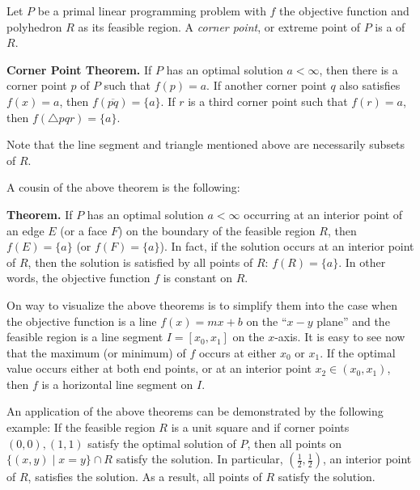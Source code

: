 \documentclass[12pt]{article}
\begin{document}
Let $P$ be a primal linear programming problem with $f$ the objective function and polyhedron $R$ as its feasible region.  A \emph{corner point}, or extreme point of $P$ is a  of $R$.

\textbf{Corner Point Theorem.}  If $P$ has an optimal solution $a<\infty$, then there is a corner point $p$ of $P$ such that $f(p)=a$.  If another corner point $q$ also satisfies $f(x)=a$, then $f(\overline{pq})=\lbrace a\rbrace$.  If $r$ is a third corner point such that $f(r)=a$, then $f(\triangle pqr)=\lbrace a\rbrace$.

Note that the line segment and triangle mentioned above are necessarily subsets of $R$.

A cousin of the above theorem is the following:

\textbf{Theorem.}  If $P$ has an optimal solution $a<\infty$ occurring at an interior point of an edge $E$ (or a face $F$) on the boundary of the feasible region $R$, then $f(E)=\lbrace a\rbrace$ (or $f(F)=\lbrace a\rbrace$).  In fact, if the solution occurs at an interior point of $R$, then the solution is satisfied by all points of $R$: $f(R)=\lbrace a\rbrace$.  In other words, the objective function $f$ is constant on $R$.

On way to visualize the above theorems is to simplify them into the case when the objective function is a line $f(x)=mx+b$ on the ``$x-y$ plane'' and the feasible region is a line segment $I=[x_0,x_1]$ on the $x$-axis.  It is easy to see now that the maximum (or minimum) of $f$ occurs at either $x_0$ or $x_1$.  If the optimal value occurs either at both end points, or at an interior point $x_2\in(x_0,x_1)$, then $f$ is a horizontal line segment on $I$.

An application of the above theorems can be demonstrated by the following example:  If the feasible region $R$ is a unit square and if corner points $(0,0),(1,1)$ satisfy the optimal solution of $P$, then all points on $\lbrace (x,y)\mid x=y\rbrace \cap R$ satisfy the solution.  In particular, $(\frac{1}{2},\frac{1}{2})$, an interior point of $R$, satisfies the solution.  As a result, all points of $R$ satisfy the solution.
\end{document}
